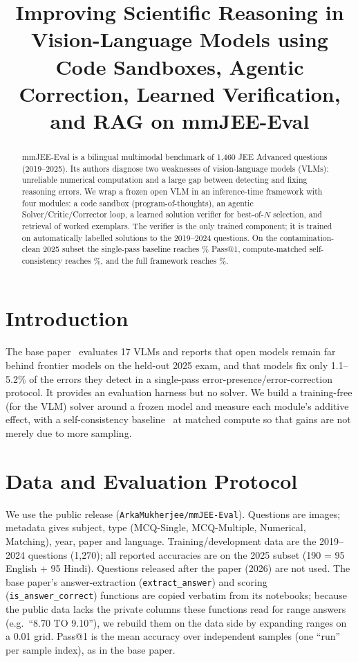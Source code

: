 \documentclass[conference]{IEEEtran}
\begin{document}
\title{Improving Scientific Reasoning in Vision-Language Models using Code Sandboxes,
Agentic Correction, Learned Verification, and RAG on mmJEE-Eval}
\author{
}
\maketitle

\begin{abstract}
mmJEE-Eval is a bilingual multimodal benchmark of 1{,}460 JEE Advanced questions
(2019--2025). Its authors diagnose two weaknesses of vision-language models
(VLMs): unreliable numerical computation and a large gap between detecting and
fixing reasoning errors. We wrap a frozen open VLM in an inference-time framework
with four modules: a code sandbox (program-of-thoughts), an agentic
Solver/Critic/Corrector loop, a learned solution verifier for best-of-$N$
selection, and retrieval of worked exemplars. The verifier is the only trained
component; it is trained on automatically labelled solutions to the 2019--2024
questions. On the contamination-clean 2025 subset the single-pass baseline
reaches \BaselineAcc\% Pass@1, compute-matched self-consistency reaches
\SCAcc\%, and the full framework reaches \FullAcc\%.
\end{abstract}

\section{Introduction}
The base paper~\cite{mmjee} evaluates 17 VLMs and reports that open models
remain far behind frontier models on the held-out 2025 exam, and that models
fix only 1.1--5.2\% of the errors they detect in a single-pass
error-presence/error-correction protocol. It provides an evaluation harness but
no solver. We build a training-free (for the VLM) solver around a frozen model
and measure each module's additive effect, with a self-consistency
baseline~\cite{selfconsistency} at matched compute so that gains are not merely
due to more sampling.

\section{Data and Evaluation Protocol}
We use the public release (\texttt{ArkaMukherjee/mmJEE-Eval}). Questions are
images; metadata gives subject, type (MCQ-Single, MCQ-Multiple, Numerical,
Matching), year, paper and language. Training/development data are the
2019--2024 questions (1{,}270); all reported accuracies are on the 2025 subset
(190 = 95 English + 95 Hindi). Questions released after the paper (2026) are
not used. The base paper's answer-extraction (\texttt{extract\_answer}) and
scoring (\texttt{is\_answer\_correct}) functions are copied verbatim from its
notebooks; because the public data lacks the private columns these functions
read for range answers (e.g.\ ``8.70 TO 9.10''), we rebuild them on the data
side by expanding ranges on a 0.01 grid. Pass@1 is the mean accuracy over
independent samples (one ``run'' per sample index), as in the base paper.
\end{document}

